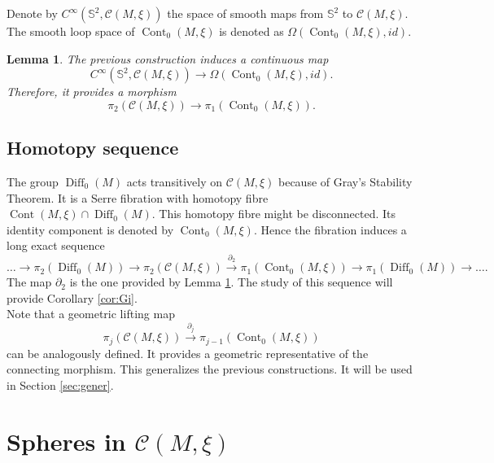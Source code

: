 \documentclass[10pt]{amsart}
\newtheorem{lemma}[proposition]{Lemma}
\begin{document}
\noindent Denote by $C^{\infty}({\mathbb{S}}^2, {\mathcal{C}}(M, \xi))$ the space of smooth maps from ${\mathbb{S}}^2$ to ${\mathcal{C}}(M,\xi)$. The smooth loop space of ${\operatorname{Cont}}_0(M,\xi)$ is denoted as $\Omega({\operatorname{Cont}}_0(M,\xi), id)$.
\begin{lemma} \label{lem:north}
The previous construction induces a continuous map
$$ C^{\infty}({\mathbb{S}}^2, {\mathcal{C}}(M, \xi)) \longrightarrow \Omega({\operatorname{Cont}}_0(M,\xi), id). $$
Therefore, it provides a morphism
$$ \pi_2({\mathcal{C}}(M, \xi)) \longrightarrow \pi_1({\operatorname{Cont}}_0(M,\xi)). $$
\end{lemma}

\subsection{Homotopy sequence}
The group ${\operatorname{Diff}}_0(M)$ acts transitively on ${\mathcal{C}}(M,\xi)$ because of Gray's Stability Theorem. It is a Serre fibration with homotopy fibre  ${\operatorname{Cont}}(M,\xi)\cap{\operatorname{Diff}}_0(M)$. This homotopy fibre might be disconnected. Its identity component is denoted by ${\operatorname{Cont}}_0(M,\xi)$. Hence the fibration induces a long exact sequence
\begin{equation} \label{eq:seq}
\ldots\longrightarrow\pi_2({\operatorname{Diff}}_0(M))\longrightarrow\pi_2({\mathcal{C}}(M,\xi))\stackrel{\partial_2}{\longrightarrow} \pi_1({\operatorname{Cont}}_0(M,\xi))\longrightarrow\pi_1({\operatorname{Diff}}_0(M))\longrightarrow\ldots. 
\end{equation}
The map $\partial_2$ is the one provided by Lemma \ref{lem:north}. The study of this sequence will provide Corollary \ref{cor:Gi}. \\

\noindent Note that a geometric lifting map
\begin{equation}
\pi_j({\mathcal{C}}(M,\xi))\stackrel{\partial_j}{\longrightarrow} \pi_{j-1}({\operatorname{Cont}}_0(M,\xi))
\label{eq:lifting}
\end{equation}
can be analogously defined. It provides a geometric representative of the connecting morphism. This generalizes the previous constructions. It will be used in Section \ref{sec:gener}.
\section{Spheres in ${\mathcal{C}}(M,\xi)$}\label{sec:lin}
\end{document}

